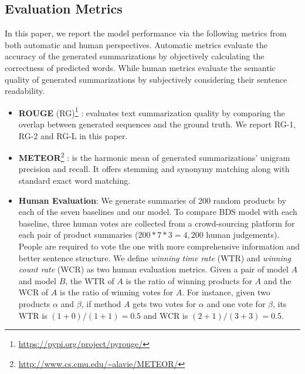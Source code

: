 \subsection{Evaluation Metrics}
In this paper, we report the model performance via the following metrics from both automatic and human perspectives. Automatic metrics evaluate the accuracy of the generated summarizations by objectively calculating the correctness of predicted words. While human metrics evaluate the semantic quality of generated summarizations by subjectively considering their sentence readability. 
\begin{itemize}
	\item \textbf{ROUGE} (RG)\footnote{\url{https://pypi.org/project/pyrouge/}}
	: evaluates text summarization quality by comparing the overlap between generated sequences and the ground truth. We report RG-1, RG-2 and RG-L in this paper.
	\item \textbf{METEOR}\footnote{\url{http://www.cs.cmu.edu/~alavie/METEOR/}}
	: is the harmonic mean of generated summarizations' unigram precision and recall. It offers stemming and synonymy matching along with standard exact word matching.
	
	\item \textbf{Human Evaluation}: We generate summaries of 200 random products by each of the seven baselines and our model. To compare BDS model with each baseline, three human votes are collected from a crowd-sourcing platform for each pair of product summaries ($200*7*3 = 4,200$ human judgements). People are required to vote the one with more comprehensive information and better sentence structure. We define \textit{winning time rate} (WTR) and \textit{winning count rate}  (WCR) as two human evaluation metrics. Given a pair of model $A$ and model $B$, the WTR of $A$ is the ratio of winning products for $A$ and the WCR of $A$ is the ratio of winning votes for $A$. For instance, given two products $\alpha$ and $\beta$, if method $A$ gets two votes for $\alpha$ and one vote for $\beta$, its WTR is $(1+0)/(1+1)=0.5$ and WCR is $(2+1)/(3+3)=0.5$.
\end{itemize}
